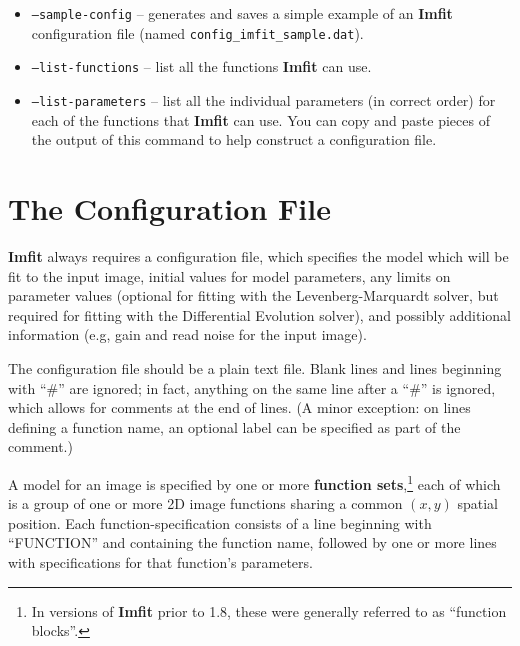 \documentclass[10pt,a4paper,article]{memoir}
\newcommand{\imfit}{\textbf{Imfit}}
\newcommand{\Imfit}{\textbf{Imfit}}
\begin{document}
\begin{itemize}
\bigskip

\item \texttt{--sample-config} -- generates and saves a simple example
of an \imfit{} configuration file (named
\texttt{config\_imfit\_sample.dat}).

\item \texttt{--list-functions} -- list all the functions \imfit{} can use.

\item \texttt{--list-parameters} -- list all the individual parameters (in correct order)
for each of the functions that \imfit{} can use. You can copy and paste pieces of the output
of this command to help construct a configuration file.
\end{itemize}




\newpage

\chapter{The Configuration File}\label{sec:configfile}

\Imfit{} always requires a configuration file, which specifies the model
which will be fit to the input image, initial values for model parameters, any
limits on parameter values (optional for fitting with the Levenberg-Marquardt
solver, but required for fitting with the Differential Evolution solver), and
possibly additional information (e.g, gain and read noise for the input image).

The configuration file should be a plain text file. Blank lines and
lines beginning with ``\#'' are ignored; in fact, anything on the same line after a
``\#'' is ignored, which allows for comments at the end of lines. (A minor exception:
on lines defining a function name, an optional label can be specified as part
of the comment.)

A model for an image is specified by one or more \textbf{function sets},\footnote{In
versions of \Imfit{} prior to 1.8, these were generally referred to as ``function 
blocks''.} each of
which is a group of one or more 2D image functions sharing a common $(x,y)$
spatial position. Each function-specification consists of a line beginning with
``FUNCTION'' and containing the function name, followed by one or more lines
with specifications for that function's parameters.

\bigskip
\end{document}

